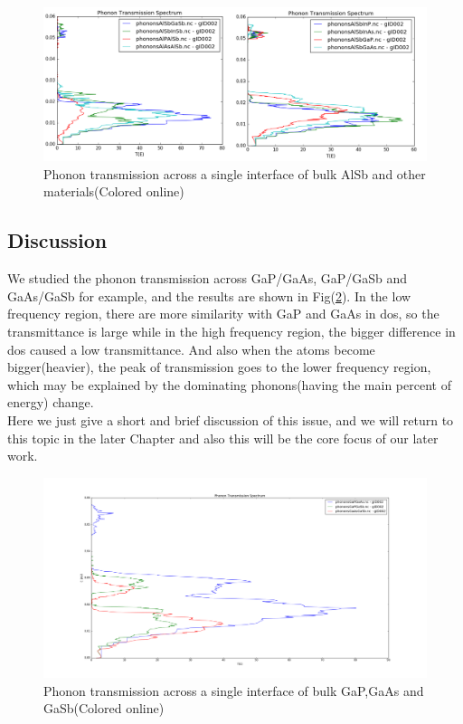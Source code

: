 \begin{figure}

\centering
\includegraphics[width=\textwidth]{AlSb.png}
\caption{Phonon transmission across a single interface of bulk AlSb and other materials(Colored online)}
\label{fig:TAlSb}
\end{figure}%

\subsection{Discussion}
We studied the phonon transmission across GaP/GaAs, GaP/GaSb and GaAs/GaSb for example, and the results are shown in Fig(\ref{fig:TGa}). In the low frequency region, there are more similarity with GaP and GaAs in dos, so the transmittance is large while in the high frequency region, the bigger difference in dos caused a low transmittance. And also when the atoms become bigger(heavier), the peak of transmission goes to the lower frequency region, which may be explained by the dominating phonons(having the main percent of energy) change.\\
\indent Here we just give a short and brief discussion of this issue, and we will return to this topic in the later Chapter and also this will be the core focus of our later work.

\begin{figure}

\centering
\includegraphics[width=\textwidth]{TGa.png}
\caption{Phonon transmission across a single interface of bulk GaP,GaAs and GaSb(Colored online)}
\label{fig:TGa}
\end{figure}%

